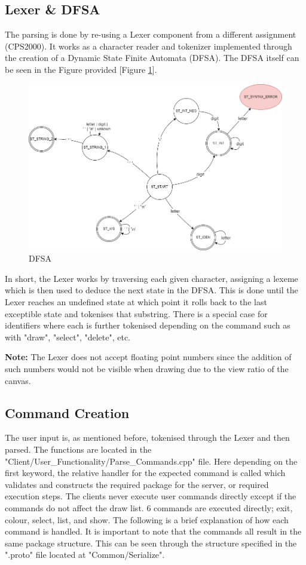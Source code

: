 \documentclass[12pt, a4paper]{report}
\begin{document}
\subsection{Lexer \& DFSA}
The parsing is done by re-using a Lexer component from a different assignment (CPS2000). It works as a character reader and tokenizer implemented through the creation of a Dynamic State Finite Automata (DFSA). The DFSA itself can be seen in the Figure provided [Figure \ref{DFSA}].
\begin{figure}[!htp]
    \centering
    \includegraphics[width=15cm]{NetScetch DFSA.drawio.png}
    \caption{DFSA}
    \label{DFSA}
\end{figure}

In short, the Lexer works by traversing each given character, assigning a lexeme which is then used to deduce the next state in the DFSA. This is done until the Lexer reaches an undefined state at which point it rolls back to the last exceptible state and tokenises that substring. There is a special case for identifiers where each is further tokenised depending on the command such as with "draw", "select", "delete", etc.

\textbf{Note:} The Lexer does not accept floating point numbers since the addition of such numbers would not be visible when drawing due to the view ratio of the canvas.

\subsection{Command Creation}
The user input is, as mentioned before, tokenised through the Lexer and then parsed. The functions are located in the "Client/User\_Functionality/Parse\_Commands.cpp" file. Here depending on the first keyword, the relative handler for the expected command is called which validates and constructs the required package for the server, or required execution steps. The clients never execute user commands directly except if the commands do not affect the draw list. 6 commands are executed directly; exit, colour, select, list, and show. The following is a brief explanation of how each command is handled. It is important to note that the commands all result in the same package structure. This can be seen through the structure specified in the ".proto" file located at "Common/Serialize".
\end{document}

